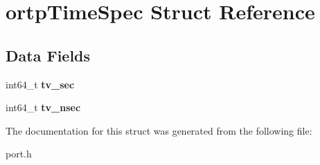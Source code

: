 \section{ortp\+Time\+Spec Struct Reference}
\label{structortpTimeSpec}
\subsection*{Data Fields}
\begin{DoxyCompactItemize}
\item 
\mbox{\label{structortpTimeSpec_ad41e5629f09ee8c4771658c3ba6a3341}} 
int64\+\_\+t {\bfseries tv\+\_\+sec}
\item 
\mbox{\label{structortpTimeSpec_a2150f8bdf7f892cddfe4f1919780e1f6}} 
int64\+\_\+t {\bfseries tv\+\_\+nsec}
\end{DoxyCompactItemize}


The documentation for this struct was generated from the following file\+:\begin{DoxyCompactItemize}
\item 
port.\+h\end{DoxyCompactItemize}
